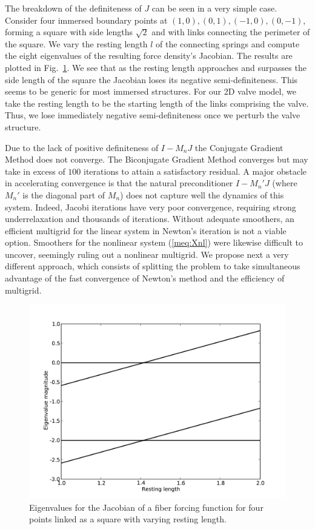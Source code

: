 The breakdown of the definiteness of $J$ can be seen in a very simple case. Consider four immersed boundary points at $(1,0),(0,1),(-1,0),(0,-1)$, forming a square with side lengths $\sqrt{2}$ and with links connecting the perimeter of the square. We vary the resting length $l$ of the connecting springs and compute the eight eigenvalues of the resulting force density's Jacobian. The results are plotted in
Fig.~\ref{fig:BoxEigenvalues}. We see that as the resting length approaches and surpasses the side length of the square the Jacobian loses its negative semi-definiteness. This seems to be generic
for most immersed structures. For our 2D valve model, we take the resting length to be the starting length of the links comprising the valve. Thus,  we  lose immediately negative semi-definiteness once we perturb the valve structure.

Due to the lack of positive definiteness of $I-M_nJ$  the Conjugate Gradient Method does not converge. The Biconjugate Gradient Method converges but may take in excess of $100$ iterations to attain a satisfactory residual. A major obstacle in accelerating convergence is that the natural preconditioner $I-M_n'J$ (where $M_n'$ is the diagonal part of $M_n$) does not capture well the dynamics of this system. Indeed, Jacobi iterations have very poor convergence, requiring strong underrelaxation and thousands of iterations. Without adequate smoothers, an efficient  multigrid for the linear system in Newton's iteration is not a viable option. Smoothers for the nonlinear system (\ref{meq:Xnl}) were likewise difficult to uncover, seemingly ruling out a nonlinear multigrid. We propose next a very different approach,  which consists of splitting the 
problem to take simultaneous advantage of the fast convergence of Newton's method and the efficiency of multigrid. 
\begin{figure}[!b]
  \begin{center}
    \includegraphics[bb=.15in .15in 8in 6in,width=5.25in,clip]{Images_Methodology/BoxEigenvalues.pdf}
  \end{center}
  \caption{\small Eigenvalues for the Jacobian of a fiber forcing function for four points linked as a square with varying resting length.}
  \label{fig:BoxEigenvalues}
\end{figure}

